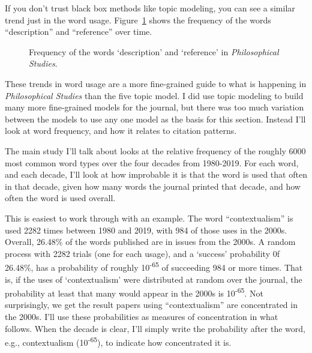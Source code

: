 \documentclass[
  10pt,
  letterpaper,
  DIV=11,
  numbers=noendperiod,
  twoside]{scrartcl}
\begin{document}
If you don't trust black box methods like topic modeling, you can see a
similar trend just in the word usage. Figure~\ref{fig-frege-russell}
shows the frequency of the words ``description'' and ``reference'' over
time.

\begin{figure}


\caption{\label{fig-frege-russell}Frequency of the words `description'
and `reference' in \emph{Philosophical Studies}.}

\end{figure}%

These trends in word usage are a more fine-grained guide to what is
happening in \emph{Philosophical Studies} than the five topic model. I
did use topic modeling to build many more fine-grained models for the
journal, but there was too much variation between the models to use any
one model as the basis for this section. Instead I'll look at word
frequency, and how it relates to citation patterns.

The main study I'll talk about looks at the relative frequency of the
roughly 6000 most common word types over the four decades from
1980-2019. For each word, and each decade, I'll look at how improbable
it is that the word is used that often in that decade, given how many
words the journal printed that decade, and how often the word is used
overall.

This is easiest to work through with an example. The word
``contextualism'' is used 2282 times between 1980 and 2019, with 984 of
those uses in the 2000s. Overall, 26.48\% of the words published are in
issues from the 2000s. A random process with 2282 trials (one for each
usage), and a `success' probability 0f 26.48\%, has a probability of
roughly 10\textsuperscript{-65} of succeeding 984 or more times. That
is, if the uses of `contextualism' were distributed at random over the
journal, the probability at least that many would appear in the 2000s is
10\textsuperscript{-65}. Not surprisingly, we get the result papers
using ``contextualism'' are concentrated in the 2000s. I'll use these
probabilities as measures of concentration in what follows. When the
decade is clear, I'll simply write the probability after the word, e.g.,
contextualism (10\textsuperscript{-65}), to indicate how concentrated it
is.
\end{document}
